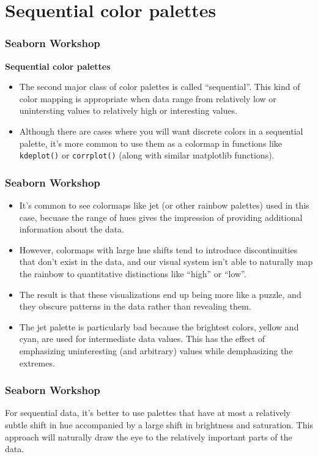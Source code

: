\documentclass{beamer}
\begin{document}
	
\section{Sequential color palettes}
\begin{frame}[fragile]
\frametitle{Seaborn Workshop}
\large

\textbf{Sequential color palettes}
\begin{itemize}
\item The second major class of color palettes is called “sequential”. This kind of color mapping is appropriate when data range from relatively low or unintersting values to relatively high or interesting values. 
\item Although there are cases where you will want discrete colors in a sequential palette, it’s more common to use them as a colormap in functions like \texttt{kdeplot()} or \texttt{corrplot()} (along with similar matplotlib functions).
\end{itemize}

\end{frame}
\begin{frame}[fragile]
	
	\frametitle{Seaborn Workshop}
	\large
\begin{itemize}
\item It’s common to see colormaps like jet (or other rainbow palettes) used in this case, becuase the range of hues gives the impression of providing additional information about the data. 
\item However, colormaps with large hue shifts tend to introduce discontinuities that don’t exist in the data, and our visual system isn’t able to naturally map the rainbow to quantitative distinctions like “high” or “low”. 
\item The result is that these visualizations end up being more like a puzzle, and they obscure patterns in the data rather than revealing them. 
\item The jet palette is particularly bad because the brightest colors, yellow and cyan, are used for intermediate data values. This has the effect of emphasizing uninteresting (and arbitrary) values while demphasizing the extremes.
\end{itemize}
\end{frame}
\begin{frame}[fragile]
	\frametitle{Seaborn Workshop}
	\large
For sequential data, it’s better to use palettes that have at most a relatively subtle shift in hue accompanied by a large shift in brightness and saturation. This approach will naturally draw the eye to the relatively important parts of the data.
\end{frame}
\end{document}
